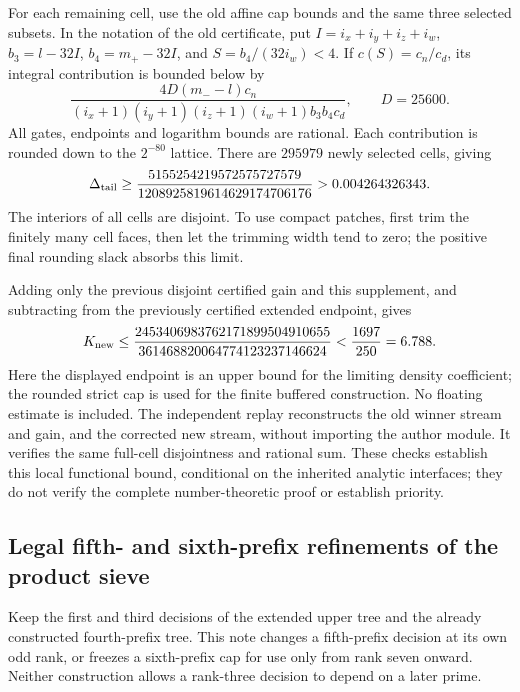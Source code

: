 \documentclass[11pt]{article}
\begin{document}
For each remaining cell, use the old affine cap bounds and the
same three selected subsets. In the notation of the old certificate,
put $I=i_x+i_y+i_z+i_w$, $b_3=l-32I$, $b_4=m_+-32I$,
and $S=b_4/(32i_w)<4$. If $c(S)=c_n/c_d$, its integral
contribution is bounded below by
\[
 \frac{4D(m_--l)c_n}
 {(i_x+1)(i_y+1)(i_z+1)(i_w+1)b_3b_4c_d},
 \qquad D=25600.
\]
All gates, endpoints and logarithm bounds are rational. Each
contribution is rounded down to the $2^{-80}$ lattice.
There are $295979$ newly selected cells, giving
\begin{equation}\label{eq:fourth-prefix-tail-gain}
 \Delta_{\rm tail}\ge
 \frac{5155254219572575727579}{1208925819614629174706176}
 >0.004264326343.
\end{equation}
The interiors of all cells are disjoint. To use compact patches,
first trim the finitely many cell faces, then let the trimming width
tend to zero; the positive final rounding slack absorbs this limit.

Adding only the previous disjoint certified gain and this supplement,
and subtracting from the previously certified extended endpoint,
gives
\[
 K_{\rm new}\le
 \frac{2453406983762171899504910655}
 {361468820064774123237146624}
 <\frac{1697}{250}=6.788.
\]
Here the displayed endpoint is an upper bound for the limiting
density coefficient; the rounded strict cap is used for the
finite buffered construction. No floating estimate is included.
The independent replay reconstructs the old winner stream and gain,
and the corrected new stream, without importing the author module.
It verifies the same full-cell disjointness and rational sum.
These checks establish this local functional bound, conditional on
the inherited analytic interfaces; they do not verify the complete
number-theoretic proof or establish priority.

\subsection{Legal fifth- and sixth-prefix refinements of the product sieve}
\label{sec:higher-prefix-K-refinement}

Keep the first and third decisions of the extended upper tree and
the already constructed fourth-prefix tree. This note changes a
fifth-prefix decision at its own odd rank, or freezes a sixth-prefix
cap for use only from rank seven onward. Neither construction allows
a rank-three decision to depend on a later prime.
\end{document}
